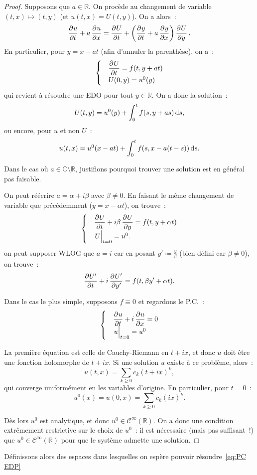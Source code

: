\documentclass{report}
\newcommand{\C}{{\mathbb C}}
\newcommand{\R}{{\mathbb R}}
\newcommand{\restr}[2]{\left.#1\vphantom{\big|}\right|_{#2}}
\theoremstyle{definition}
\theoremstyle{remark}
\begin{document}
\begin{proof} Supposons que $a \in \R$. On procède au changement de variable $(t, x) \mapsto (t, y)$ (et $u(t, x) = U(t, y)$). On a alors~:
\[\dpd ut + a \dpd ux = \dpd Ut + \left(\dpd yt + a\dpd yx\right)\dpd Uy.\]
En particulier, pour $y = x - at$ (afin d'annuler la parenthèse), on a~:
\[\begin{cases}&\dpd Ut = f(t, y+at)\\&U(0, y) = u^0(y)\end{cases}\]
qui revient à résoudre une EDO pour tout $y \in \R$. On a donc la solution~:
\[U(t, y) = u^0(y) + \int_0^tf(s, y+as)\dif s,\]
ou encore, pour $u$ et non $U$~:
\[u(t, x) = u^0(x-at) + \int_0^tf(s, x-a(t-s))\dif s.\]

Dans le cas où $a \in \C \setminus \R$, justifions pourquoi trouver une solution est en général pas faisable.

On peut réécrire $a = \alpha + i\beta$ avec $\beta \neq 0$. En faisant le même changement de variable que précédemment ($y = x-\alpha t$), on trouve~:
\[\begin{cases}&\dpd Ut + i\beta\dpd Uy = f(t, y+\alpha t)\\&\restr U{t=0} = u^0.\end{cases}\]
on peut supposer WLOG que $a = i$ car en posant $y' \coloneqq \frac y\beta$ (bien défini car $\beta \neq 0$), on trouve~:
\[\dpd {U'}t + i\dpd {U'}{y'} = f(t, \beta y' + \alpha t).\]

Dans le cas le plus simple, supposons $f \equiv 0$ et regardons le P.C.~:
\[\begin{cases}&\dpd ut + i\dpd ux = 0\\&\restr u{t=0} = u^0\end{cases}\]

La première équation est celle de Cauchy-Riemann en $t + ix$, et donc $u$ doit être une fonction holomorphe de $t + ix$. Si une solution $u$ existe à ce problème, alors~:
\[u(t, x) = \sum_{k \geq 0}c_k(t+ix)^k,\]
qui converge uniformément en les variables d'origine. En particulier, pour $t=0$~:
\[u^0(x) = u(0, x) = \sum_{k \geq 0}c_k(ix)^k.\]

Dès lors $u^0$ est analytique, et donc $u^0 \in \mathcal C^\infty(\R)$. On a donc une condition extrêmement restrictive sur le choix de $u^0$~: il est nécessaire (mais pas suffisant~!)
que $u^0 \in \mathcal C^\infty(\R)$ pour que le système admette une solution.
\end{proof}

Définissons alors des espaces dans lesquelles on espère pouvoir résoudre~\eqref{eq:PC EDP}
\end{document}
